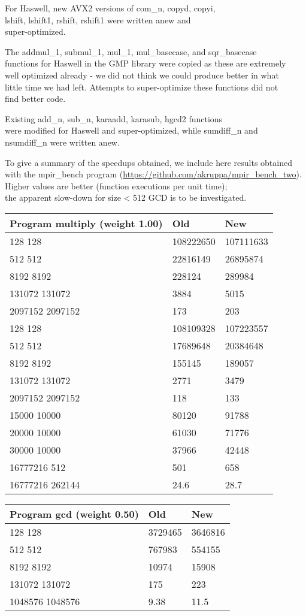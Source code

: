 For Haswell, new AVX2 versions of com\_n, copyd, copyi,\\
lshift, lshift1, rshift, rshift1 were written anew and\\
super-optimized.

The addmul\_1, submul\_1, mul\_1, mul\_basecase, and sqr\_basecase\\
functions for Haswell in the GMP library were copied as these are
extremely\\
well optimized already - we did not think we could produce better in
what\\
little time we had left. Attempts to super-optimize these functions did
not\\
find better code.

Existing add\_n, sub\_n, karaadd, karasub, hgcd2 functions\\
were modified for Haswell and super-optimized, while sumdiff\_n and\\
nsumdiff\_n were written anew.

To give a summary of the speedups obtained, we include here results
obtained\\
with the mpir\_bench program
(\url{https://github.com/akruppa/mpir_bench_two}).\\
Higher values are better (function executions per unit time);\\
the apparent slow-down for size \textless{} 512 GCD is to be
investigated.

\begin{longtable}[c]{@{}lll@{}}
\toprule
Program multiply (weight 1.00) & Old & New\tabularnewline
\midrule
\endhead
128 128 & 108222650 & 107111633\tabularnewline
512 512 & 22816149 & 26895874\tabularnewline
8192 8192 & 228124 & 289984\tabularnewline
131072 131072 & 3884 & 5015\tabularnewline
2097152 2097152 & 173 & 203\tabularnewline
128 128 & 108109328 & 107223557\tabularnewline
512 512 & 17689648 & 20384648\tabularnewline
8192 8192 & 155145 & 189057\tabularnewline
131072 131072 & 2771 & 3479\tabularnewline
2097152 2097152 & 118 & 133\tabularnewline
15000 10000 & 80120 & 91788\tabularnewline
20000 10000 & 61030 & 71776\tabularnewline
30000 10000 & 37966 & 42448\tabularnewline
16777216 512 & 501 & 658\tabularnewline
16777216 262144 & 24.6 & 28.7\tabularnewline
\bottomrule
\end{longtable}

\begin{longtable}[c]{@{}lll@{}}
\toprule
Program gcd (weight 0.50) & Old & New\tabularnewline
\midrule
\endhead
128 128 & 3729465 & 3646816\tabularnewline
512 512 & 767983 & 554155\tabularnewline
8192 8192 & 10974 & 15908\tabularnewline
131072 131072 & 175 & 223\tabularnewline
1048576 1048576 & 9.38 & 11.5\tabularnewline
\bottomrule
\end{longtable}

